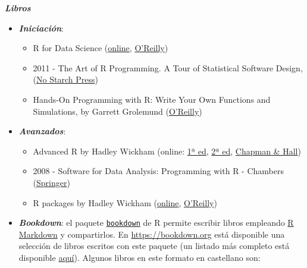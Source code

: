 \documentclass[
]{book}
\begin{document}
\textbf{\emph{Libros}}

\begin{itemize}
\item
  \textbf{\emph{Iniciación}}:

  \begin{itemize}
  \item
    R for Data Science
    (\href{http://r4ds.had.co.nz/}{online}, \href{http://shop.oreilly.com/product/0636920034407.do}{O'Reilly})
  \item
    2011 - The Art of R Programming. A Tour of Statistical Software Design,
    (\href{https://www.nostarch.com/artofr.htm}{No Starch Press})
  \item
    Hands-On Programming with R: Write Your Own Functions and Simulations,
    by Garrett Grolemund
    (\href{http://shop.oreilly.com/product/0636920028574.do}{O'Reilly})
  \end{itemize}
\item
  \textbf{\emph{Avanzados}}:

  \begin{itemize}
  \item
    Advanced R by Hadley Wickham
    (online: \href{http://adv-r.had.co.nz/}{1ª ed},
    \href{https://adv-r.hadley.nz/}{2ª ed},
    \href{https://www.amazon.com/dp/1466586966}{Chapman \& Hall})
  \item
    2008 - Software for Data Analysis: Programming with R - Chambers
    (\href{http://www.springer.com/la/book/9780387759357}{Springer})
  \item
    R packages by Hadley Wickham
    (\href{http://r-pkgs.had.co.nz/}{online},
    \href{http://shop.oreilly.com/product/0636920034421.do}{O'Reilly})
  \end{itemize}
\item
  \textbf{\emph{Bookdown}}:
  el paquete \href{https://bookdown.org}{\texttt{bookdown}} de R permite escribir libros empleando
  \href{http://rmarkdown.rstudio.com}{R Markdown} y compartirlos.
  En \url{https://bookdown.org} está disponible una selección de libros escritos con este paquete
  (un listado más completo está disponible \href{https://bookdown.org/home/archive/}{aquí}).
  Algunos libros en este formato en castellano son:


\end{itemize}
\end{document}
